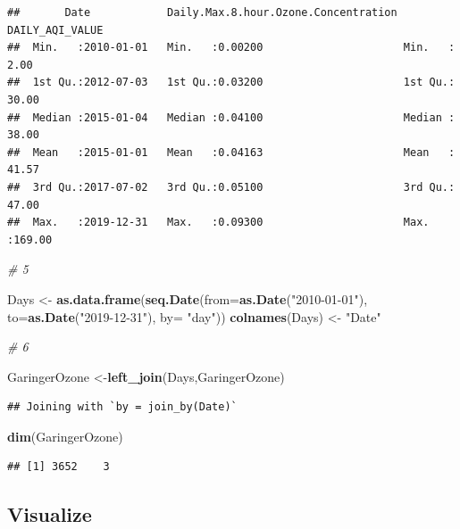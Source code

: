 \documentclass[
]{article}
\newenvironment{Shaded}{\begin{snugshade}}{\end{snugshade}}
\newcommand{\AttributeTok}[1]{\textcolor[rgb]{0.13,0.29,0.53}{#1}}
\newcommand{\CommentTok}[1]{\textcolor[rgb]{0.56,0.35,0.01}{\textit{#1}}}
\newcommand{\FunctionTok}[1]{\textcolor[rgb]{0.13,0.29,0.53}{\textbf{#1}}}
\newcommand{\NormalTok}[1]{#1}
\newcommand{\OtherTok}[1]{\textcolor[rgb]{0.56,0.35,0.01}{#1}}
\newcommand{\StringTok}[1]{\textcolor[rgb]{0.31,0.60,0.02}{#1}}
\begin{document}
\begin{verbatim}
##       Date            Daily.Max.8.hour.Ozone.Concentration DAILY_AQI_VALUE 
##  Min.   :2010-01-01   Min.   :0.00200                      Min.   :  2.00  
##  1st Qu.:2012-07-03   1st Qu.:0.03200                      1st Qu.: 30.00  
##  Median :2015-01-04   Median :0.04100                      Median : 38.00  
##  Mean   :2015-01-01   Mean   :0.04163                      Mean   : 41.57  
##  3rd Qu.:2017-07-02   3rd Qu.:0.05100                      3rd Qu.: 47.00  
##  Max.   :2019-12-31   Max.   :0.09300                      Max.   :169.00
\end{verbatim}

\begin{Shaded}
\begin{Highlighting}[]
\CommentTok{\# 5}

\NormalTok{Days }\OtherTok{\textless{}{-}} \FunctionTok{as.data.frame}\NormalTok{(}\FunctionTok{seq.Date}\NormalTok{(}\AttributeTok{from=}\FunctionTok{as.Date}\NormalTok{(}\StringTok{"2010{-}01{-}01"}\NormalTok{),}
                                 \AttributeTok{to=}\FunctionTok{as.Date}\NormalTok{(}\StringTok{"2019{-}12{-}31"}\NormalTok{),}
                                 \AttributeTok{by=} \StringTok{"day"}\NormalTok{))}
\FunctionTok{colnames}\NormalTok{(Days) }\OtherTok{\textless{}{-}} \StringTok{"Date"}

\CommentTok{\# 6}

\NormalTok{GaringerOzone }\OtherTok{\textless{}{-}}\FunctionTok{left\_join}\NormalTok{(Days,GaringerOzone)}
\end{Highlighting}
\end{Shaded}

\begin{verbatim}
## Joining with `by = join_by(Date)`
\end{verbatim}

\begin{Shaded}
\begin{Highlighting}[]
\FunctionTok{dim}\NormalTok{(GaringerOzone)}
\end{Highlighting}
\end{Shaded}

\begin{verbatim}
## [1] 3652    3
\end{verbatim}

\subsection{Visualize}\label{visualize}
\end{document}
